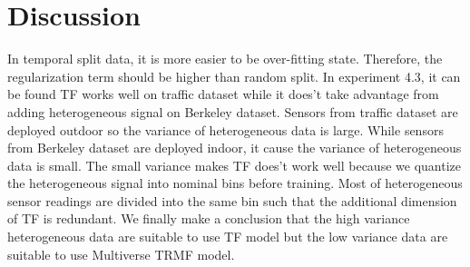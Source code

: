 \section{Discussion}  \label{sec:disc}

In temporal split data, it is more easier to be over-fitting state. Therefore, the regularization term should be higher than random split.
In experiment 4.3, it can be found TF works well on traffic dataset while it does't take advantage from adding heterogeneous signal on Berkeley dataset. Sensors from traffic dataset are deployed outdoor so the variance of heterogeneous data is large. While sensors from Berkeley dataset are deployed indoor, it cause the variance of heterogeneous data is small. The small variance makes TF does't work well because we quantize the heterogeneous signal into nominal bins before training. Most of heterogeneous sensor readings are divided into the same bin such that the additional dimension of TF is redundant.
We finally make a conclusion that the high variance heterogeneous data are suitable to use TF model but the low variance data are suitable to use Multiverse TRMF model. 
